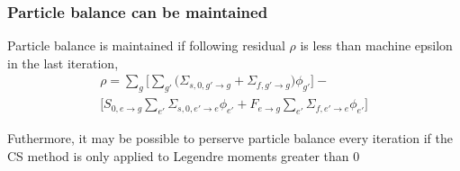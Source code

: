 \documentclass[xcolor=dvipsnames]{beamer}
\begin{document}
\begin{frame}
\frametitle{Particle balance can be maintained}
Particle balance is maintained if following residual $\rho$ is less than machine epsilon in the last iteration,
\begin{multline*}
\label{eq:scatter}
\rho = \sum_{g}  \Big[ \sum_{g'}  \big( \Sigma_{s,0,g'\to g} + \Sigma_{f,g' \to g} \big)  \phi_{g'} \Big] - \\ \Big[ S_{0,e\to g} \sum_{e'} \Sigma_{s,0,e'\to e} \phi_{e'} + F_{e\to g} \sum_{e'}  \Sigma_{f,e' \to e} \phi_{e'} \Big] 
\end{multline*}

Futhermore, it may be possible to perserve particle balance every iteration if the CS method is only applied to Legendre moments greater than 0
\end{frame}
\end{document}
